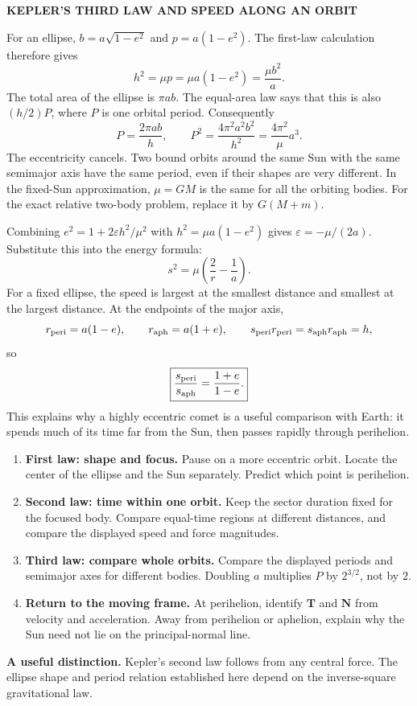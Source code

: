 \documentclass[11pt,letterpaper]{article}
\newcommand{\T}{\mathbf T}\newcommand{\N}{\mathbf N}\newcommand{\B}{\mathbf B}
\newcommand{\heading}[1]{\vspace{3pt}{\large\bfseries #1}\par}
\newcommand{\subhead}[1]{\textbf{#1}\quad}
\newcommand{\tagline}[1]{{\small\bfseries\color{inkblue}#1}\par}
\begin{document}
\newpage
\tagline{KEPLER'S THIRD LAW AND SPEED ALONG AN ORBIT}
\heading{The period follows from area and angular momentum}
For an ellipse, $b=a\sqrt{1-e^2}$ and $p=a(1-e^2)$. The first-law calculation therefore gives
\[
 h^2=\mu p=\mu a(1-e^2)=\frac{\mu b^2}{a}.
\]
The total area of the ellipse is $\pi ab$. The equal-area law says that this is also $(h/2)P$, where $P$ is one orbital period. Consequently
\[
 P=\frac{2\pi ab}{h},\qquad
 P^2=\frac{4\pi^2a^2b^2}{h^2}
 =\boxed{\frac{4\pi^2}{\mu}a^3}.
\]
The eccentricity cancels. Two bound orbits around the same Sun with the same semimajor axis have the same period, even if their shapes are very different. In the fixed-Sun approximation, $\mu=GM$ is the same for all the orbiting bodies. For the exact relative two-body problem, replace it by $G(M+m)$.

\heading{How quickly does the body move?}
Combining $e^2=1+2\varepsilon h^2/\mu^2$ with $h^2=\mu a(1-e^2)$ gives $\varepsilon=-\mu/(2a)$. Substitute this into the energy formula:
\[
 \boxed{s^2=\mu\left(\frac2r-\frac1a\right).}
\]
For a fixed ellipse, the speed is largest at the smallest distance and smallest at the largest distance. At the endpoints of the major axis,
\[
 r_{\rm peri}=a(1-e),\qquad r_{\rm aph}=a(1+e),\qquad
 s_{\rm peri}r_{\rm peri}=s_{\rm aph}r_{\rm aph}=h,
\]
so
\[
 \boxed{\frac{s_{\rm peri}}{s_{\rm aph}}=\frac{1+e}{1-e}.}
\]
This explains why a highly eccentric comet is a useful comparison with Earth: it spends much of its time far from the Sun, then passes rapidly through perihelion.

\heading{Use the solar presentation to distinguish the laws}
\begin{enumerate}
 \item \textbf{First law: shape and focus.} Pause on a more eccentric orbit. Locate the center of the ellipse and the Sun separately. Predict which point is perihelion.
 \item \textbf{Second law: time within one orbit.} Keep the sector duration fixed for the focused body. Compare equal-time regions at different distances, and compare the displayed speed and force magnitudes.
 \item \textbf{Third law: compare whole orbits.} Compare the displayed periods and semimajor axes for different bodies. Doubling $a$ multiplies $P$ by $2^{3/2}$, not by $2$.
 \item \textbf{Return to the moving frame.} At perihelion, identify $\T$ and $\N$ from velocity and acceleration. Away from perihelion or aphelion, explain why the Sun need not lie on the principal-normal line.
\end{enumerate}
\subhead{A useful distinction.} Kepler's second law follows from any central force. The ellipse shape and period relation established here depend on the inverse-square gravitational law.
\end{document}
